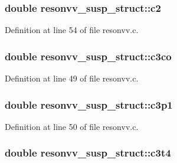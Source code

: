 \subsubsection[{\texorpdfstring{c2}{c2}}]{\setlength{\rightskip}{0pt plus 5cm}double resonvv\+\_\+susp\+\_\+struct\+::c2}\hypertarget{structresonvv__susp__struct_a288a80ddca6231cd8b2f768d17a65aa3}{}\label{structresonvv__susp__struct_a288a80ddca6231cd8b2f768d17a65aa3}


Definition at line 54 of file resonvv.\+c.

\subsubsection[{\texorpdfstring{c3co}{c3co}}]{\setlength{\rightskip}{0pt plus 5cm}double resonvv\+\_\+susp\+\_\+struct\+::c3co}\hypertarget{structresonvv__susp__struct_a5a33dfe761c2c233109c7fa2bcb58e31}{}\label{structresonvv__susp__struct_a5a33dfe761c2c233109c7fa2bcb58e31}


Definition at line 49 of file resonvv.\+c.

\subsubsection[{\texorpdfstring{c3p1}{c3p1}}]{\setlength{\rightskip}{0pt plus 5cm}double resonvv\+\_\+susp\+\_\+struct\+::c3p1}\hypertarget{structresonvv__susp__struct_a18b5cdcc63403879abe4045db2262049}{}\label{structresonvv__susp__struct_a18b5cdcc63403879abe4045db2262049}


Definition at line 50 of file resonvv.\+c.

\subsubsection[{\texorpdfstring{c3t4}{c3t4}}]{\setlength{\rightskip}{0pt plus 5cm}double resonvv\+\_\+susp\+\_\+struct\+::c3t4}\hypertarget{structresonvv__susp__struct_a1968a492794914b0347c530d2d20f3e4}{}\label{structresonvv__susp__struct_a1968a492794914b0347c530d2d20f3e4}


